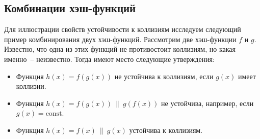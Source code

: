 \subsection{Комбинации хэш-функций}

Для иллюстрации свойств устойчивости к коллизиям исследуем следующий пример комбинирования двух хэш-функций. Рассмотрим две хэш-функции $f$ и $g$. Известно, что одна из этих функций не противостоит коллизиям, но какая именно~-- неизвестно. Тогда имеют место следующие утверждения:
\begin{itemize}
    \item Функция $h(x) = f(g(x))$ не устойчива к коллизиям, если $g(x)$ имеет коллизии.
    \item Функция $h(x) = f(g(x)) ~\|~ g(f(x))$ не устойчива, например, если $g(x) = \textrm{const}$.
    \item Функция $h(x) = f(x) ~\|~ g(x)$ устойчива к коллизиям.
\end{itemize}
